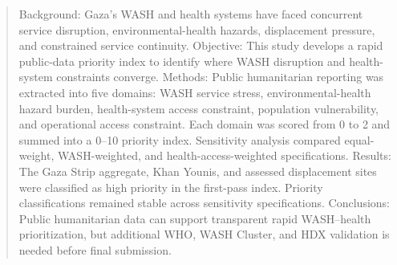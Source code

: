 \begin{abstract}
\noindent Background: Gaza's WASH and health systems have faced concurrent service disruption, environmental-health hazards, displacement pressure, and constrained service continuity. Objective: This study develops a rapid public-data priority index to identify where WASH disruption and health-system constraints converge. Methods: Public humanitarian reporting was extracted into five domains: WASH service stress, environmental-health hazard burden, health-system access constraint, population vulnerability, and operational access constraint. Each domain was scored from 0 to 2 and summed into a 0--10 priority index. Sensitivity analysis compared equal-weight, WASH-weighted, and health-access-weighted specifications. Results: The Gaza Strip aggregate, Khan Younis, and assessed displacement sites were classified as high priority in the first-pass index. Priority classifications remained stable across sensitivity specifications. Conclusions: Public humanitarian data can support transparent rapid WASH--health prioritization, but additional WHO, WASH Cluster, and HDX validation is needed before final submission.
\end{abstract}
